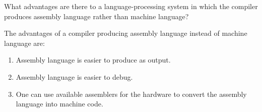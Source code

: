 \begin{exercise}\label{ex:010103}
    What advantages are there to a language-processing system in which the 
    compiler produces assembly language rather than machine language?
\end{exercise}
\begin{solution}\label{sol:010103}
    The advantages of a compiler producing assembly language instead of machine
    language are:
    \begin{enumerate}
        \item Assembly language is easier to produce as output.
        \item Assembly language is easier to debug.
        \item One can use available assemblers for the hardware to convert the
        assembly language into machine code.
    \end{enumerate}
\end{solution}
